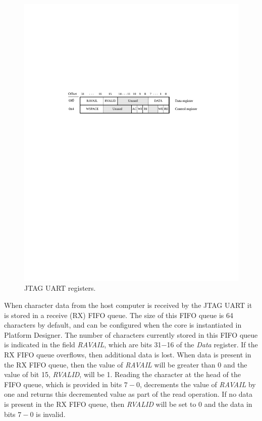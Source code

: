\documentclass[11pt, twoside, pdftex]{article}
\begin{document}
\begin{figure}[h!]
   \begin{center}
       \includegraphics{figures/fig_jtaguart_regmap.pdf}
   \end{center}
   \caption{JTAG UART registers.}
	\label{fig:jtag_uart_regmap}
\end{figure}

When character data from the host computer is received by the JTAG UART 
it is stored in a receive (RX) FIFO queue. The size of this FIFO queue is 64 characters by default, and can be configured when the core is instantiated in Platform Designer. The number of characters currently stored in this FIFO queue is
indicated in the field {\it RAVAIL}, which are
bits 31$-$16 of the {\it Data} register.  If the RX FIFO queue overflows, then
additional data is lost. When data is present in the RX FIFO queue, then the value of {\it RAVAIL} will be 
greater than 0 and the value of bit 15, {\it RVALID}, will be 1. Reading the character at
the head of the FIFO queue, which is provided in bits $7-0$, decrements the value of {\it RAVAIL} 
by one and returns this decremented value as part of the read
operation. If no data is present in the RX FIFO queue, then {\it RVALID} will 
be set to 0 and the data in bits $7-0$ is invalid.
\end{document}

